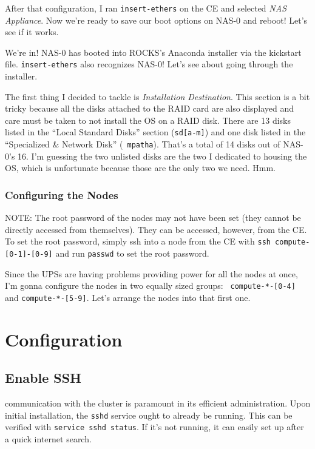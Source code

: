 \documentclass[12pt]{article}
\begin{document}
\qq After that configuration, I ran {\tt insert-ethers} on the CE and selected
\textit{NAS Appliance}. Now we're ready to save our boot options on NAS-0 and
reboot! Let's see if it works.

\qq We're in! NAS-0 has booted into ROCKS's Anaconda installer via the kickstart
file. {\tt insert-ethers} also recognizes NAS-0! Let's see about going through
the installer.

\qq The first thing I decided to tackle is \textit{Installation
  Destination}. This section is a bit tricky because all the disks attached to
the RAID card are also displayed and care must be taken to not install the OS on
a RAID disk. There are 13 disks listed in the ``Local Standard Disks'' section
({\tt sd[a-m]}) and one disk listed in the ``Specialized \& Network Disk'' ({\tt
  mpatha}). That's a total of 14 disks out of NAS-0's 16. I'm guessing the two
unlisted disks are the two I dedicated to housing the OS, which is unfortunate
because those are the only two we need. Hmm.

\subsubsection{Configuring the Nodes}

\qq NOTE: The root password of the nodes may not have been set (they cannot be
directly accessed from themselves). They can be accessed, however, from the
CE. To set the root password, simply ssh into a node from the CE with {\tt ssh
  compute-[0-1]-[0-9]} and run {\tt passwd} to set the root password. 

\qq Since the UPSs are having problems providing power for all the nodes at
once, I'm gonna configure the nodes in two equally sized groups: {\tt
  compute-*-[0-4]} and {\tt compute-*-[5-9]}. Let's arrange the nodes into that
first one.




\section{Configuration}

\subsection{Enable SSH}

 communication with the cluster is paramount in its efficient
administration. Upon initial installation, the {\tt sshd} service ought to
already be running. This can be verified with {\tt service sshd status}. If it's
not running, it can easily set up after a quick internet search.
\end{document}
